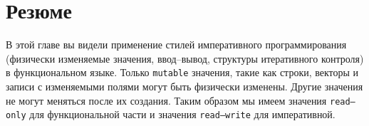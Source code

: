 \section{Резюме}
\label{sec:summary_3}

В этой главе вы видели применение стилей императивного программирования
(физически изменяемые значения, ввод–вывод, структуры итеративного контроля) в
функциональном языке. Только \texttt{mutable} значения, такие как строки,
векторы и записи с изменяемыми полями могут быть физически изменены. Другие
значения не могут меняться после их создания. Таким образом мы имеем значения
\texttt{read--only} для функциональной части и значения \texttt{read--write} для
императивной.

